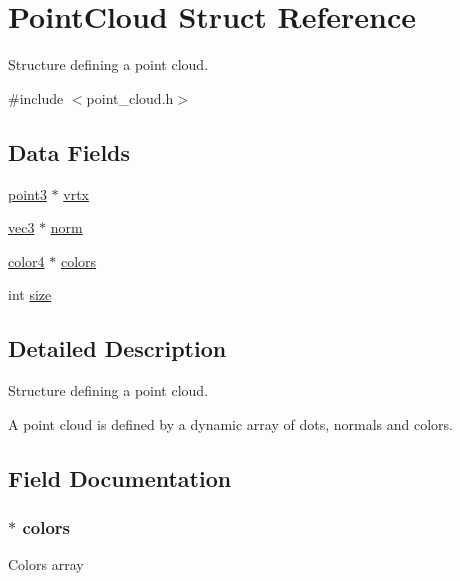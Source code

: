\hypertarget{struct_point_cloud}{}\section{Point\+Cloud Struct Reference}
\label{struct_point_cloud}


Structure defining a point cloud.  




{\ttfamily \#include $<$point\+\_\+cloud.\+h$>$}

\subsection*{Data Fields}
\begin{DoxyCompactItemize}
\item 
\hyperlink{types_8h_a5680245085eb6c3661c1ec194979ccd2}{point3} $\ast$ \hyperlink{struct_point_cloud_acc4ce4ac840fff526719963ba4289b8b}{vrtx}
\item 
\hyperlink{types_8h_a1c0f6462cae9caa5b9f49d5ffd32af60}{vec3} $\ast$ \hyperlink{struct_point_cloud_aaa4eb83d6f0f6e7ca1065538784d7de8}{norm}
\item 
\hyperlink{types_8h_a3d75ae93fc87c7ef6399af18de18ed4a}{color4} $\ast$ \hyperlink{struct_point_cloud_a106152c26e8e3dd135a56d7a6431fc9a}{colors}
\item 
int \hyperlink{struct_point_cloud_a439227feff9d7f55384e8780cfc2eb82}{size}
\end{DoxyCompactItemize}


\subsection{Detailed Description}
Structure defining a point cloud. 

A point cloud is defined by a dynamic array of dots, normals and colors. 

\subsection{Field Documentation}
\subsubsection[{\texorpdfstring{colors}{colors}}]{$\ast$ colors}\hypertarget{struct_point_cloud_a106152c26e8e3dd135a56d7a6431fc9a}{}\label{struct_point_cloud_a106152c26e8e3dd135a56d7a6431fc9a}
Colors array 
